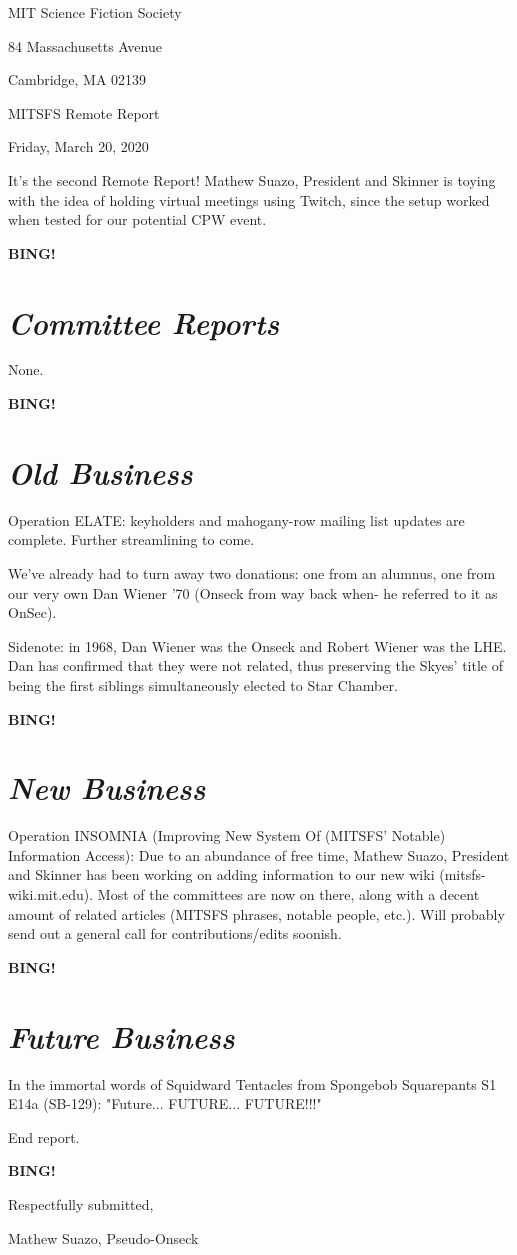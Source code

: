 \documentclass[10pt]{article}
\newcommand{\bing}{{\bf BING!} }
\newcommand{\goto}[1]{\bing \vskip 12pt \section*{{\em{#1}}}}
\newcommand{\skinner}{Mathew Suazo, President and Skinner\xspace}
\newcommand{\onseck}{Mathew Suazo, Pseudo-Onseck\xspace}
\newcommand{\meetingdate}{Friday, March 20, 2020}
\begin{document}
\begin{center}

MIT Science Fiction Society

84 Massachusetts Avenue

Cambridge, MA 02139

\vspace{12pt}

MITSFS Remote Report

\meetingdate

\end{center}

\vspace{18pt}

\setlength{\parskip}{6pt}

\noindent
It's the second Remote Report! \skinner is toying with the idea of holding virtual meetings using Twitch, since the setup worked when tested for our potential CPW event.

\goto{Committee Reports}

None.

\goto{Old Business}

Operation ELATE: keyholders and mahogany-row mailing list updates are complete. Further streamlining to come.

We've already had to turn away two donations: one from an alumnus, one from our very own Dan Wiener '70 (Onseck from way back when- he referred to it as OnSec).

Sidenote: in 1968, Dan Wiener was the Onseck and Robert Wiener was the LHE. Dan has confirmed that they were not related, thus preserving the Skyes' title of being the first siblings simultaneously elected to Star Chamber.

\goto{New Business}

Operation INSOMNIA (Improving New System Of (MITSFS' Notable) Information Access): Due to an abundance of free time, \skinner has been working on adding information to our new wiki (mitsfs-wiki.mit.edu). Most of the committees are now on there, along with a decent amount of related articles (MITSFS phrases, notable people, etc.). Will probably send out a general call for contributions/edits soonish.

\goto{Future Business}

In the immortal words of Squidward Tentacles from Spongebob Squarepants S1 E14a (SB-129): "Future... FUTURE... FUTURE!!!"

\noindent
End report.

\bing
\vspace{18pt}

\centerline{Respectfully submitted,}
\centerline{\onseck}
\end{document}
